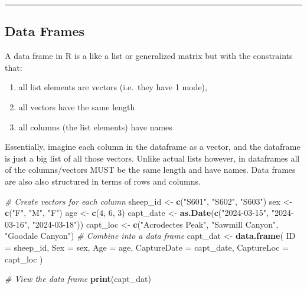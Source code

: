 \documentclass[
]{book}
\newenvironment{Shaded}{\begin{snugshade}}{\end{snugshade}}
\newcommand{\AttributeTok}[1]{\textcolor[rgb]{0.13,0.29,0.53}{#1}}
\newcommand{\CommentTok}[1]{\textcolor[rgb]{0.56,0.35,0.01}{\textit{#1}}}
\newcommand{\DecValTok}[1]{\textcolor[rgb]{0.00,0.00,0.81}{#1}}
\newcommand{\FunctionTok}[1]{\textcolor[rgb]{0.13,0.29,0.53}{\textbf{#1}}}
\newcommand{\NormalTok}[1]{#1}
\newcommand{\OtherTok}[1]{\textcolor[rgb]{0.56,0.35,0.01}{#1}}
\newcommand{\StringTok}[1]{\textcolor[rgb]{0.31,0.60,0.02}{#1}}
\providecommand{\tightlist}{%
  \setlength{\itemsep}{0pt}\setlength{\parskip}{0pt}}
\begin{document}
\begin{center}\rule{0.5\linewidth}{0.5pt}\end{center}

\subsection{Data Frames}\label{data-frames}

A data frame in R is a like a list or generalized matrix but with the constraints that:

\begin{enumerate}
\def\labelenumi{(\arabic{enumi})}
\tightlist
\item
  all list elements are vectors (i.e.~they have 1 mode),
\item
  all vectors have the same length
\item
  all columns (the list elements) have names
\end{enumerate}

Essentially, imagine each column in the dataframe as a vector, and the dataframe is just a big list of all those vectors. Unlike actual lists however, in dataframes all of the columns/vectors MUST be the same length and have names. Data frames are also also structured in terms of rows and columns.

\begin{Shaded}
\begin{Highlighting}[]
\CommentTok{\# Create vectors for each column}
\NormalTok{sheep\_id }\OtherTok{\textless{}{-}} \FunctionTok{c}\NormalTok{(}\StringTok{"S601"}\NormalTok{, }\StringTok{"S602"}\NormalTok{, }\StringTok{"S603"}\NormalTok{)}
\NormalTok{sex }\OtherTok{\textless{}{-}} \FunctionTok{c}\NormalTok{(}\StringTok{"F"}\NormalTok{, }\StringTok{"M"}\NormalTok{, }\StringTok{"F"}\NormalTok{)}
\NormalTok{age }\OtherTok{\textless{}{-}} \FunctionTok{c}\NormalTok{(}\DecValTok{4}\NormalTok{, }\DecValTok{6}\NormalTok{, }\DecValTok{3}\NormalTok{) }
\NormalTok{capt\_date }\OtherTok{\textless{}{-}} \FunctionTok{as.Date}\NormalTok{(}\FunctionTok{c}\NormalTok{(}\StringTok{"2024{-}03{-}15"}\NormalTok{, }\StringTok{"2024{-}03{-}16"}\NormalTok{, }\StringTok{"2024{-}03{-}18"}\NormalTok{))}
\NormalTok{capt\_loc }\OtherTok{\textless{}{-}} \FunctionTok{c}\NormalTok{(}\StringTok{"Acrodectes Peak"}\NormalTok{, }\StringTok{"Sawmill Canyon"}\NormalTok{, }\StringTok{"Goodale Canyon"}\NormalTok{)}
\CommentTok{\# Combine into a data frame}
\NormalTok{capt\_dat }\OtherTok{\textless{}{-}} \FunctionTok{data.frame}\NormalTok{(}
  \AttributeTok{ID =}\NormalTok{ sheep\_id,}
  \AttributeTok{Sex =}\NormalTok{ sex,}
  \AttributeTok{Age =}\NormalTok{ age,}
  \AttributeTok{CaptureDate =}\NormalTok{ capt\_date,}
  \AttributeTok{CaptureLoc =}\NormalTok{ capt\_loc}
\NormalTok{)}

\CommentTok{\# View the data frame}
\FunctionTok{print}\NormalTok{(capt\_dat)}
\end{Highlighting}
\end{Shaded}
\end{document}
